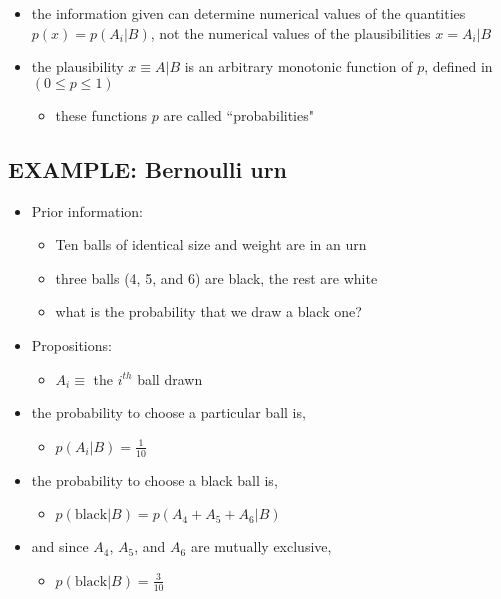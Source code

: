 \documentclass[../jaynes_prob_theory_notes.tex]{subfiles}
\begin{document}
\begin{itemize}
    \item the information given can determine numerical values of the quantities $p(x) = p(A_i|B)$, not the numerical values of the plausibilities $x = A_i|B$
    \item the plausibility $x \equiv A|B$ is an arbitrary monotonic function of $p$, defined in $(0 \leq p \leq 1)$
        \begin{itemize}
            \item these functions $p$ are called ``probabilities"
        \end{itemize}
\end{itemize}


\subsection{EXAMPLE: Bernoulli urn}
\begin{itemize}
    \item Prior information:
        \begin{itemize}
            \item Ten balls of identical size and weight are in an urn
            \item three balls (4, 5, and 6) are black, the rest are white
            \item what is the probability that we draw a black one?
        \end{itemize}
    
    \item Propositions:
        \begin{itemize}
            \item $A_i \equiv $ the $i^{th}$ ball drawn
        \end{itemize}
    
    \item the probability to choose a particular ball is,
        \begin{itemize}
            \item[] $p(A_i|B) = \frac{1}{10}$
        \end{itemize}
    
    \item the probability to choose a black ball is,
        \begin{itemize}
            \item[] $p(\mathrm{black}|B) = p(A_4 + A_5 + A_6|B)$
        \end{itemize}
    
    \item and since $A_4$, $A_5$, and $A_6$ are mutually exclusive,
        \begin{itemize}
            \item[] $p(\mathrm{black}|B) = \frac{3}{10}$
        \end{itemize}
\end{itemize}
\end{document}

